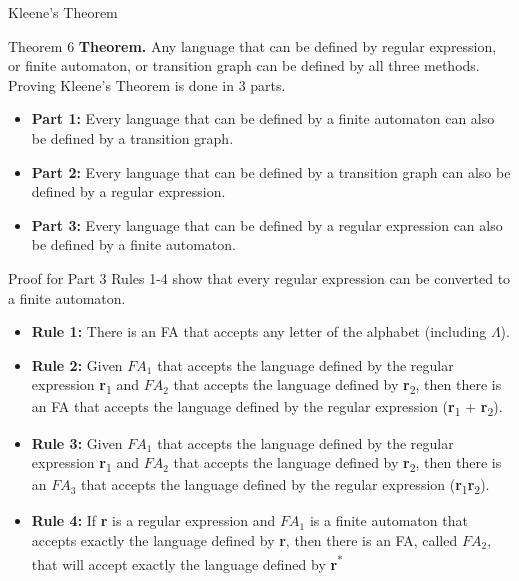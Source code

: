 \documentclass{article}
\begin{document}
\begin{multicols*}{3}
\begin{blackbox}{Kleene's Theorem}
    \begin{redbox}{Theorem 6}
        \textbf{Theorem.} Any language that can be defined by regular expression, or finite automaton, or transition graph can be defined by all three methods. Proving Kleene's Theorem is done in 3 parts. 
        \begin{itemize}[leftmargin=0.3cm]
            \item \textbf{Part 1:} Every language that can be defined by a finite automaton can also be defined by a transition graph.
            \item \textbf{Part 2:} Every language that can be defined by a transition graph can also be defined by a regular expression.
            \item \textbf{Part 3:} Every language that can be defined by a regular expression can also be defined by a finite automaton. 
        \end{itemize}
        \begin{brownbox}{Proof for Part 3}
            Rules 1-4 show that every regular expression can be converted to a finite automaton.
            \begin{itemize}[leftmargin=0.3cm]
                \item \textbf{Rule 1:} There is an FA that accepts any letter of the alphabet (including $\Lambda$). 
                \item \textbf{Rule 2:} Given $FA_1$ that accepts the language defined by the regular expression \textbf{r}\textsubscript{1} and $FA_2$ that accepts the language defined by \textbf{r}\textsubscript{2}, then there is an FA that accepts the language defined by the regular expression (\textbf{r}\textsubscript{1} + \textbf{r}\textsubscript{2}). 
                \item \textbf{Rule 3:} Given $FA_1$ that accepts the language defined by the regular expression \textbf{r}\textsubscript{1} and $FA_2$ that accepts the language defined by \textbf{r}\textsubscript{2}, then there is an $FA_3$ that accepts the language defined by the regular expression (\textbf{r}\textsubscript{1}\textbf{r}\textsubscript{2}).
                \item \textbf{Rule 4:} If \textbf{r} is a regular expression and $FA_1$ is a finite automaton that accepts exactly the language defined by \textbf{r}, then there is an FA, called $FA_2$, that will accept exactly the language defined by \textbf{r}\textsuperscript{*}
            \end{itemize}

\end{brownbox}
\end{redbox}
\end{blackbox}
\end{multicols*}
\end{document}
